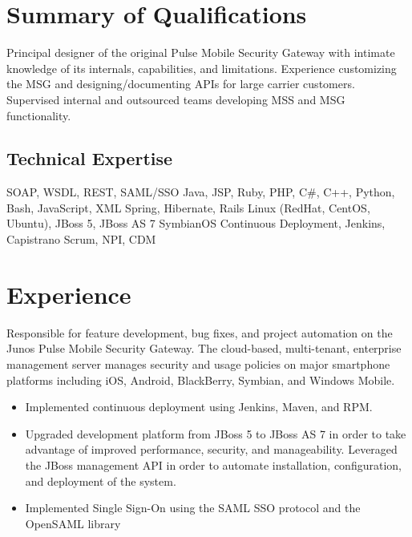 \documentclass[12pt,letter,sans]{moderncv}
\begin{document}
\makecvtitle

\section{Summary of Qualifications}

Principal designer of the original Pulse Mobile Security Gateway with intimate
knowledge of its internals, capabilities, and limitations.  Experience
customizing the MSG and designing/documenting APIs for large carrier customers.
Supervised internal and outsourced teams developing MSS and MSG functionality.

\subsection{Technical Expertise}

 { SOAP, WSDL, REST, SAML/SSO }
 { Java, JSP, Ruby, PHP, C\#, C++, Python, Bash, JavaScript, XML }
 { Spring, Hibernate, Rails }
 { Linux (RedHat, CentOS, Ubuntu), JBoss 5, JBoss AS 7 }
 { SymbianOS }
 { Continuous Deployment, Jenkins, Capistrano }
 { Scrum, NPI, CDM }

\section{Experience}


Responsible for feature development, bug fixes, and project automation on the
Junos Pulse Mobile Security Gateway.  The cloud-based, multi-tenant, enterprise
management server manages security and usage policies on major
smartphone platforms including iOS, Android, BlackBerry, Symbian, and Windows
Mobile.

\begin{itemize}

    \item Implemented continuous deployment using Jenkins, Maven, and RPM.

    \item Upgraded development platform from JBoss 5 to JBoss AS 7 in order to
        take advantage of improved performance, security, and manageability.
        Leveraged the JBoss management API in order to automate installation,
        configuration, and deployment of the system.

    \item Implemented Single Sign-On using the SAML SSO protocol and the OpenSAML
        library

\end{itemize}
\end{document}
